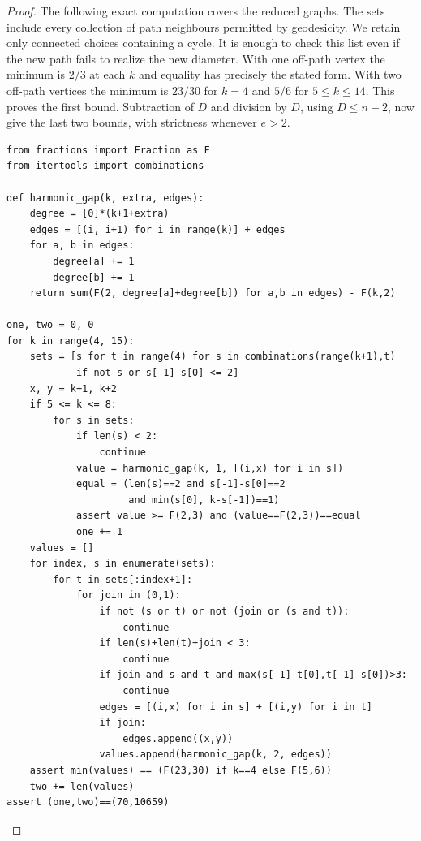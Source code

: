 \documentclass[11pt,a4paper]{article}
\theoremstyle{remark}\newtheorem*{remark}{Remark}
\begin{document}
\begin{proof}
The following exact computation covers the reduced graphs. The sets include every collection of path neighbours permitted by geodesicity. We retain only connected choices containing a cycle. It is enough to check this list even if the new path fails to realize the new diameter. With one off-path vertex the minimum is $2/3$ at each $k$ and equality has precisely the stated form. With two off-path vertices the minimum is $23/30$ for $k=4$ and $5/6$ for $5\le k\le14$. This proves the first bound. Subtraction of $D$ and division by $D$, using $D\le n-2$, now give the last two bounds, with strictness whenever $e>2$.
\begin{lstlisting}[basicstyle=\ttfamily\footnotesize,breaklines=true]
from fractions import Fraction as F
from itertools import combinations

def harmonic_gap(k, extra, edges):
    degree = [0]*(k+1+extra)
    edges = [(i, i+1) for i in range(k)] + edges
    for a, b in edges:
        degree[a] += 1
        degree[b] += 1
    return sum(F(2, degree[a]+degree[b]) for a,b in edges) - F(k,2)

one, two = 0, 0
for k in range(4, 15):
    sets = [s for t in range(4) for s in combinations(range(k+1),t)
            if not s or s[-1]-s[0] <= 2]
    x, y = k+1, k+2
    if 5 <= k <= 8:
        for s in sets:
            if len(s) < 2:
                continue
            value = harmonic_gap(k, 1, [(i,x) for i in s])
            equal = (len(s)==2 and s[-1]-s[0]==2
                     and min(s[0], k-s[-1])==1)
            assert value >= F(2,3) and (value==F(2,3))==equal
            one += 1
    values = []
    for index, s in enumerate(sets):
        for t in sets[:index+1]:
            for join in (0,1):
                if not (s or t) or not (join or (s and t)):
                    continue
                if len(s)+len(t)+join < 3:
                    continue
                if join and s and t and max(s[-1]-t[0],t[-1]-s[0])>3:
                    continue
                edges = [(i,x) for i in s] + [(i,y) for i in t]
                if join:
                    edges.append((x,y))
                values.append(harmonic_gap(k, 2, edges))
    assert min(values) == (F(23,30) if k==4 else F(5,6))
    two += len(values)
assert (one,two)==(70,10659)
\end{lstlisting}
\end{proof}
\end{document}

